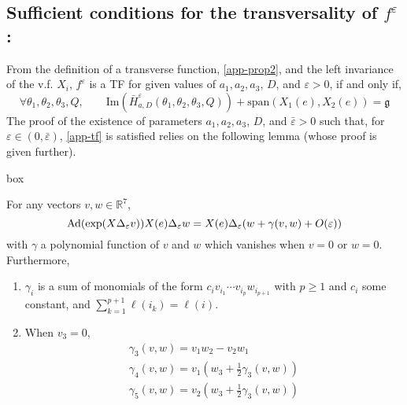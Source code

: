 \documentclass[a4paper,twoside]{article}
\def \g {{\mathfrak g}}
\def \Ad {\textnormal{Ad}}
\def \RR {{\mathbb R}}
\def \eps {\varepsilon}
\def \span {\textnormal{span}}
\begin{document}
\subsection*{Sufficient conditions for the transversality of $f^\eps$:}

From the definition of a transverse function, \eqref{app-prop2}, and the left invariance of the v.f. $X_i$, 
$f^\eps$ is a TF for given values of 
$a_1, a_2, a_3$, $D$, and $\eps>0$, if and only if, 
\begin{equation}
\label{app-tf}
\forall \theta_1,\theta_2, \theta_3, Q, \qquad
\text{Im} (\bar H_{a,D}^\eps(\theta_1,\theta_2, \theta_3,Q)) + \text{span}(X_1(e),X_2(e)) = \g 
\end{equation}
The proof of the existence of parameters $a_1, a_2, a_3$, $D$, and $\bar \eps>0$ such that, 
for $\eps \in (0, \bar \eps)$, \eqref{app-tf} is satisfied relies on the following lemma (whose proof is given further).
\begin{boxitpara}{box}
\begin{lemma}
\label{lem-app}
For any vectors $v, w \in \RR^7$,
\begin{equation}
\label{lem-eq1}
\Ad(\exp(X \Delta_\eps v)) X(e) \Delta_\eps w = X(e) \Delta_\eps (w+\gamma(v,w) + O(\eps)) 
\end{equation}
with $\gamma$ a polynomial function of $v$ and $w$ which vanishes when $v=0$ or $w=0$.
Furthermore, 
\begin{enumerate}
\item $\gamma_i$ is a sum of monomials of the form $c_i v_{i_1} \cdots v_{i_p} w_{i_{p+1}}$ with $p \geq 1$ and 
$c_i$ some constant, and $\sum_{k=1}^{p+1} \ell(i_k) = \ell(i)$.
\item When $v_3=0$,
\begin{equation}
\label{lem-eq2}
\begin{array}{l}
\gamma_3(v,w)= v_1 w_2 -v_2 w_1 \\
\gamma_4(v,w)= v_1( w_3 +\frac{1}{2} \gamma_3(v,w)) \\
\gamma_5(v,w)= v_2( w_3 +\frac{1}{2} \gamma_3(v,w)) 
\end{array}
\end{equation}
\end{enumerate}
\end{lemma}
\end{boxitpara}
\begin{comment}
\footnote{Another interpretation of this property is that each of 
these monomials is homogeneous of degree $\ell(i)$ w.r.t. the dilation associated with the filtration 
$\g_1, \ldots, \g_4$ of $\g$ defined by $\g_k = \span_\RR \{ X_i: \ell(i) \leq k \}$}
\end{comment}
\end{document}
